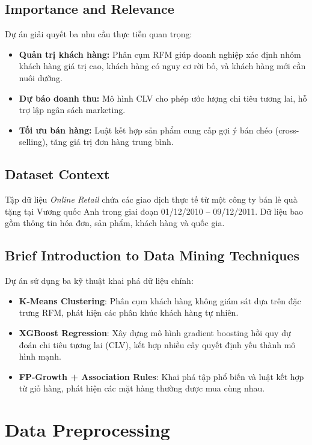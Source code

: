 \documentclass[a4paper,12pt]{article}
\begin{document}
\subsection{Importance and Relevance}
Dự án giải quyết ba nhu cầu thực tiễn quan trọng:
\begin{itemize}
    \item \textbf{Quản trị khách hàng:} Phân cụm RFM giúp doanh nghiệp xác định nhóm khách hàng giá trị cao, khách hàng có nguy cơ rời bỏ, và khách hàng mới cần nuôi dưỡng.
    \item \textbf{Dự báo doanh thu:} Mô hình CLV cho phép ước lượng chi tiêu tương lai, hỗ trợ lập ngân sách marketing.
    \item \textbf{Tối ưu bán hàng:} Luật kết hợp sản phẩm cung cấp gợi ý bán chéo (cross-selling), tăng giá trị đơn hàng trung bình.
\end{itemize}

\subsection{Dataset Context}
Tập dữ liệu \textit{Online Retail} chứa các giao dịch thực tế từ một công ty bán lẻ quà tặng tại Vương quốc Anh trong giai đoạn 01/12/2010 -- 09/12/2011. Dữ liệu bao gồm thông tin hóa đơn, sản phẩm, khách hàng và quốc gia.

\subsection{Brief Introduction to Data Mining Techniques}
Dự án sử dụng ba kỹ thuật khai phá dữ liệu chính:
\begin{itemize}
    \item \textbf{K-Means Clustering}: Phân cụm khách hàng không giám sát dựa trên đặc trưng RFM, phát hiện các phân khúc khách hàng tự nhiên.
    \item \textbf{XGBoost Regression}: Xây dựng mô hình gradient boosting hồi quy dự đoán chi tiêu tương lai (CLV), kết hợp nhiều cây quyết định yếu thành mô hình mạnh.
    \item \textbf{FP-Growth + Association Rules}: Khai phá tập phổ biến và luật kết hợp từ giỏ hàng, phát hiện các mặt hàng thường được mua cùng nhau.
\end{itemize}

\section{Data Preprocessing}
\end{document}
